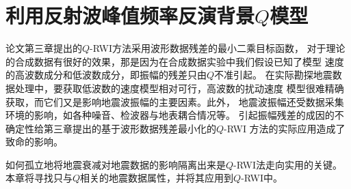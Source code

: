 
\chapter{利用反射波峰值频率反演背景$Q$模型}

论文第三章提出的$Q$-RWI方法采用波形数据残差的最小二乘目标函数，
对于理论的合成数据有很好的效果，那是因为在合成数据实验中我们假设已知了模型
速度的高波数成分和低波数成分，即振幅的残差只由$Q$不准引起。
在实际勘探地震数据处理中，要获取低波数的速度模型相对可行，高波数的扰动速度
模型很难精确获取，而它们又是影响地震波振幅的主要因素。此外，
地震波振幅还受数据采集环境的影响，如各种噪音、检波器与地表耦合情况等。
引起振幅残差的成因的不确定性给第三章提出的基于波形数据残差最小化的$Q$-RWI
方法的实际应用造成了致命的影响。

如何孤立地将地震衰减对地震数据的影响隔离出来是$Q$-RWI法走向实用的关键。
本章将寻找只与$Q$相关的地震数据属性，并将其应用到$Q$-RWI中。

\vspace{1.0cm}
